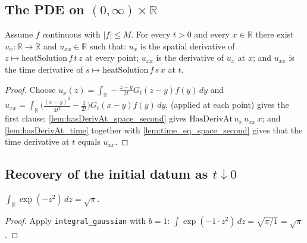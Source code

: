 \subsection{The PDE on $(0,\infty)\times\mathbb{R}$}

\begin{lemma}
    \label{lem:pde_part}
    \leanok
    Assume $f$ continuous with $\lvert f\rvert \le M$. For every $t > 0$ and every
    $x \in \mathbb{R}$ there exist $u_x : \mathbb{R} \to \mathbb{R}$ and
    $u_{xx} \in \mathbb{R}$ such that: $u_x$ is the spatial derivative of
    $z \mapsto \mathrm{heatSolution}\,f\,t\,z$ at every point; $u_{xx}$ is the
    derivative of $u_x$ at $x$; and $u_{xx}$ is the time derivative of
    $s \mapsto \mathrm{heatSolution}\,f\,s\,x$ at $t$.
\end{lemma}
\begin{proof}
    Choose $u_x(z) = \int_{\mathbb{R}} -\tfrac{z-y}{2t} G_t(z-y) f(y)\, dy$ and
    $u_{xx} = \int_{\mathbb{R}} \bigl(\tfrac{(x-y)^2}{4t^2}-\tfrac{1}{2t}\bigr)
    G_t(x-y) f(y)\, dy$.  (applied at each point) gives the
    first clause; \cref{lem:hasDerivAt_space_second} gives
    $\mathrm{HasDerivAt}\,u_x\,u_{xx}\,x$; and \cref{lem:hasDerivAt_time} together with
    \cref{lem:time_eq_space_second} gives that the time derivative at $t$ equals
    $u_{xx}$.
\end{proof}

\subsection{Recovery of the initial datum as $t \downarrow 0$}

\begin{lemma}
    \label{lem:gaussian_total_mass}
    \leanok
    $\int_{\mathbb{R}} \exp(-z^2)\, dz = \sqrt{\pi}$.
\end{lemma}
\begin{proof}
    Apply \texttt{integral\_gaussian} with $b = 1$: $\int \exp(-1\cdot z^2)\, dz
    = \sqrt{\pi/1} = \sqrt{\pi}$.
\end{proof}

